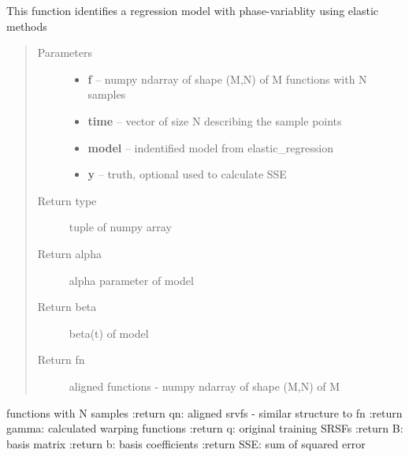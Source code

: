 \documentclass[letterpaper,10pt,english]{sphinxmanual}
\begin{document}

\begin{fulllineitems}
\label{regression:regression.elastic_prediction}
This function identifies a regression model with phase-variablity
using elastic methods
\begin{quote}\begin{description}
\item[{Parameters}] \leavevmode\begin{itemize}
\item {} 
\textbf{f} -- numpy ndarray of shape (M,N) of M functions with N samples

\item {} 
\textbf{time} -- vector of size N describing the sample points

\item {} 
\textbf{model} -- indentified model from elastic\_regression

\item {} 
\textbf{y} -- truth, optional used to calculate SSE

\end{itemize}

\item[{Return type}] \leavevmode
tuple of numpy array

\item[{Return alpha}] \leavevmode
alpha parameter of model

\item[{Return beta}] \leavevmode
beta(t) of model

\item[{Return fn}] \leavevmode
aligned functions - numpy ndarray of shape (M,N) of M

\end{description}\end{quote}

functions with N samples
:return qn: aligned srvfs - similar structure to fn
:return gamma: calculated warping functions
:return q: original training SRSFs
:return B: basis matrix
:return b: basis coefficients
:return SSE: sum of squared error

\end{fulllineitems}

\end{document}
